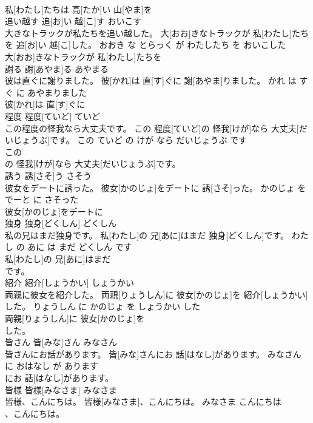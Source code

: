 \documentclass[8pt]{extreport}
\begin{document}
\begin{CJK}{UTF8}{min}
\\	私[わたし]たちは 高[たか]い 山[やま]を
\\	追い越す	追[お]い 越[こ]す	おいこす	
\\	大きなトラックが私たちを追い越した。	大[おお]きなトラックが 私[わたし]たちを 追[お]い 越[こ]した。	おおき な とらっく が わたしたち を おいこした	
\\	大[おお]きなトラックが 私[わたし]たちを
\\	謝る	謝[あやま]る	あやまる	
\\	彼は直ぐに謝りました。	彼[かれ]は 直[す]ぐに 謝[あやま]りました。	かれ は すぐ に あやまりました	
\\	彼[かれ]は 直[す]ぐに
\\	程度	程度[ていど]	ていど	
\\	この程度の怪我なら大丈夫です。	この 程度[ていど]の 怪我[けが]なら 大丈夫[だいじょうぶ]です。	この ていど の けが なら だいじょうぶ です	
\\	この
\\	の 怪我[けが]なら 大丈夫[だいじょうぶ]です。			
\\	誘う	誘[さそ]う	さそう	
\\	彼女をデートに誘った。	彼女[かのじょ]をデートに 誘[さそ]った。	かのじょ を でーと に さそった	
\\	彼女[かのじょ]をデートに
\\	独身	独身[どくしん]	どくしん	
\\	私の兄はまだ独身です。	私[わたし]の 兄[あに]はまだ 独身[どくしん]です。	わたし の あに は まだ どくしん です	
\\	私[わたし]の 兄[あに]はまだ
\\	です。			
\\	紹介	紹介[しょうかい]	しょうかい	
\\	両親に彼女を紹介した。	両親[りょうしん]に 彼女[かのじょ]を 紹介[しょうかい]した。	りょうしん に かのじょ を しょうかい した	
\\	両親[りょうしん]に 彼女[かのじょ]を
\\	した。			
\\	皆さん	皆[みな]さん	みなさん	
\\	皆さんにお話があります。	皆[みな]さんにお 話[はなし]があります。	みなさん に おはなし が あります	
\\	にお 話[はなし]があります。			
\\	皆様	皆様[みなさま]	みなさま	
\\	皆様、こんにちは。	皆様[みなさま]、こんにちは。	みなさま こんにちは	
\\	、こんにちは。			

\end{CJK}
\end{document}
